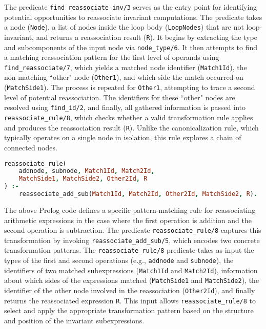 The predicate \texttt{find\_reassociate\_inv/3} serves as the entry point for identifying potential opportunities to reassociate invariant computations. The predicate takes a node (\texttt{Node}), a list of nodes inside the loop body (\texttt{LoopNodes}) that are not loop-invariant, and returns a reassociation result (\texttt{R}). It begins by extracting the type and subcomponents of the input node via \texttt{node\_type/6}. It then attempts to find a matching reassociation pattern for the first level of operands using \texttt{find\_reassociate/7}, which yields a matched node identifier (\texttt{Match1Id}), the non-matching ``other" node (\texttt{Other1}), and which side the match occurred on (\texttt{MatchSide1}). The process is repeated for \texttt{Other1}, attempting to trace a second level of potential reassociation. The identifiers for these ``other" nodes are resolved using \texttt{find\_id/2}, and finally, all gathered information is passed into \texttt{reassociate\_rule/8}, which checks whether a valid transformation rule applies and produces the reassociation result (\texttt{R}). Unlike the canonicalization rule, which typically operates on a single node in isolation, this rule explores a chain of connected nodes.

\smallbreak
\begin{lstlisting}[language=Prolog]
% Rule for addnode with subnode
reassociate_rule(
    addnode, subnode, Match1Id, Match2Id, 
    MatchSide1, MatchSide2, Other2Id, R
) :-
    reassociate_add_sub(Match1Id, Match2Id, Other2Id, MatchSide2, R).
\end{lstlisting}

\newpage
The above Prolog code defines a specific pattern-matching rule for reassociating arithmetic expressions in the case where the first operation is addition and the second operation is subtraction. The predicate \texttt{reassociate\_rule/8} captures this transformation by invoking \texttt{reassociate\_add\_sub/5}, which encodes two concrete transformation patterns.
The \texttt{reassociate\_rule/8} predicate takes as input the types of the first and second operations (e.g., \texttt{addnode} and \texttt{subnode}), the identifiers of two matched subexpressions (\texttt{Match1Id} and \texttt{Match2Id}), information about which sides of the expressions matched (\texttt{MatchSide1} and \texttt{MatchSide2}), the identifier of the other node involved in the reassociation (\texttt{Other2Id}), and finally returns the reassociated expression \texttt{R}. This input allows \texttt{reassociate\_rule/8} to select and apply the appropriate transformation pattern based on the structure and position of the invariant subexpressions.

